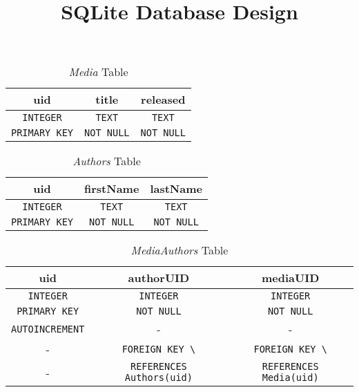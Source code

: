 \documentclass[11pt, a4paper]{article}
\title{SQLite Database Design}
\date{}
\begin{document}
    \maketitle

    \begin{table}[H]
        \centering
        \begin{tabular}{|c|c|c|}
            \hline
            \textbf{uid}              & \textbf{title}         & \textbf{released}      \\\hline\hline
            {\lstinline|INTEGER|}     & {\lstinline|TEXT|}     & {\lstinline|TEXT|}     \\\hline
            {\lstinline|PRIMARY KEY|} & {\lstinline|NOT NULL|} & {\lstinline|NOT NULL|} \\\hline
        \end{tabular}
        \caption{\textit{Media} Table}
        \label{tab:sqlite_table_Media}
    \end{table}

    \begin{table}[H]
        \centering
        \begin{tabular}{|c|c|c|}
            \hline
            \textbf{uid}              & \textbf{firstName}     & \textbf{lastName}      \\\hline\hline
            {\lstinline|INTEGER|}     & {\lstinline|TEXT|}     & {\lstinline|TEXT|}     \\\hline
            {\lstinline|PRIMARY KEY|} & {\lstinline|NOT NULL|} & {\lstinline|NOT NULL|} \\\hline
        \end{tabular}
        \caption{\textit{Authors} Table}
        \label{tab:sqlite_table_Authors}
    \end{table}

    \begin{table}[H]
        \centering
        \begin{tabular}{|c|c|c|}
            \hline
            \textbf{uid}                & \textbf{authorUID}                    & \textbf{mediaUID}                   \\\hline\hline
            {\lstinline|INTEGER|}       & {\lstinline|INTEGER|}                 & {\lstinline|INTEGER|}               \\\hline
            {\lstinline|PRIMARY KEY|}   & {\lstinline|NOT NULL|}                & {\lstinline|NOT NULL|}              \\
            {\lstinline|AUTOINCREMENT|} & -                                     & -                                   \\
            -                           & {\lstinline|FOREIGN KEY \|}           & {\lstinline|FOREIGN KEY \|}         \\
            -                           & {\lstinline|REFERENCES Authors(uid)|} & {\lstinline|REFERENCES Media(uid)|} \\\hline

        \end{tabular}
        \caption{\textit{MediaAuthors} Table}
        \label{tab:sqlite_table_MediaAuthors}
    \end{table}
\end{document}
